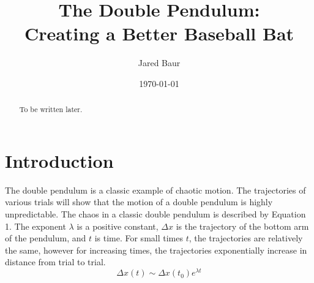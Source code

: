 \documentclass[%
 aip,
 amsmath,amssymb,
 reprint,%
 floatfix,%
]{revtex4-1}
\begin{document}

\title[]{The Double Pendulum:\\Creating a Better Baseball Bat}

\author{Jared Baur}

\date{\today}%

\begin{abstract}
	To be written later.
\end{abstract}

\maketitle


\section{\label{sec:level1}Introduction}

The double pendulum is a classic example of chaotic motion\cite{Shinbrot1992}. The trajectories of various trials will show that the motion of a double pendulum is highly unpredictable. The chaos in a classic double pendulum is described by Equation 1. The exponent $\lambda$ is a positive constant, $\Delta x$ is the trajectory of the bottom arm of the pendulum, and $t$ is time. For small times $t$, the trajectories are relatively the same, however for increasing times, the trajectories exponentially increase in distance from trial to trial.
\begin{equation}
	\Delta x(t) \sim \Delta x(t_0) e^{\lambda t}
\end{equation}
\end{document}

